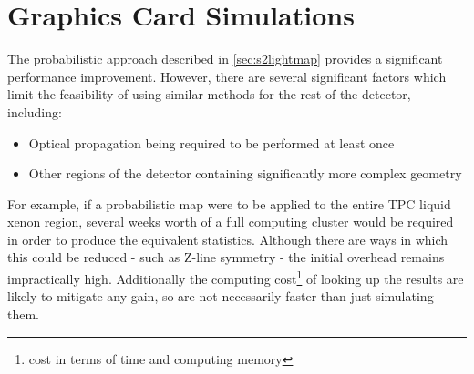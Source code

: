 \section{Graphics Card Simulations}

\par
The probabilistic approach described in \autoref{sec:s2lightmap} provides a significant performance improvement. 
However, there are several significant factors which limit the feasibility of using similar methods for the rest of the detector, including:
\begin{itemize}
    \item Optical propagation being required to be performed at least once
    \item Other regions of the detector containing significantly more complex geometry
\end{itemize}
For example, if a probabilistic map were to be applied to the entire TPC liquid xenon region, several weeks worth of a full computing cluster would be required in order to produce the equivalent statistics.
Although there are ways in which this could be reduced - such as Z-line symmetry - the initial overhead remains impractically high.
Additionally the computing cost\footnote{cost in terms of time and computing memory} of looking up the results are likely to mitigate any gain, so are not necessarily faster than just simulating them.

